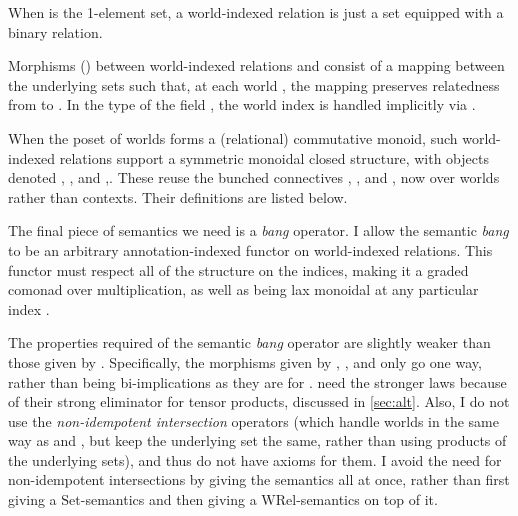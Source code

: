\begin{example}
  When  is the 1-element set, a world-indexed relation is just a
  set equipped with a binary relation.
\end{example}

Morphisms () between world-indexed relations 
and  consist of a mapping  between the
underlying sets such that, at each world , the mapping preserves
relatedness from  to .
In the type of the field , the world index is
handled implicitly via \AgdaFunction{\_$\rightarrowtriangle$\_}.


When the poset of worlds forms a (relational) commutative monoid, such
world-indexed relations support a symmetric monoidal closed structure, with
objects denoted ,
, and
,.
These reuse the bunched connectives , \AgdaRecord{$\sep$}, and
\AgdaRecord{$\wand$}, now over worlds rather than contexts.
Their definitions are listed below.


The final piece of semantics we need is a \emph{bang} operator.
I allow the
semantic \emph{bang} to be an arbitrary annotation-indexed functor on
world-indexed relations.
This functor must respect all of the structure on the indices, making it a
graded comonad over multiplication, as well as being lax monoidal at any
particular index .


The properties required of the semantic \emph{bang} operator are slightly
weaker than those given by \citet{AbelBernardy2020}.
Specifically, the morphisms given by , ,
and  only go one way, rather than being
bi-implications as they are for \citet{AbelBernardy2020}.
\citeauthor{AbelBernardy2020} need the stronger laws because of their strong
eliminator for tensor products, discussed in \cref{sec:alt}.
Also, I do not use the \emph{non-idempotent intersection} operators (which
handle worlds in the same way as  and
, but keep the
underlying set the same, rather than using products of the underlying sets),
and thus do not have axioms for them.
I avoid the need for non-idempotent intersections by giving the semantics all at
once, rather than first giving a $\mathrm{Set}$-semantics and then giving a
$\mathrm{WRel}$-semantics on top of it.

